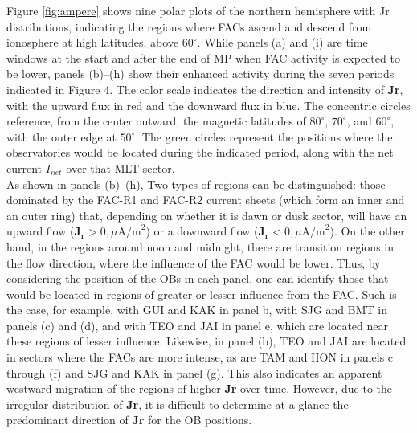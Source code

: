 \documentclass[a4paper]{article}
\theoremstyle{plain}
\theoremstyle{definition}
\begin{document}
Figure \ref{fig:ampere} shows nine polar plots of the northern hemisphere with Jr distributions, indicating the regions where FACs ascend and descend from ionosphere at high latitudes, above $60^\circ$. While panels (a) and (i) are time windows at the start and after the end of MP when FAC activity is expected to be lower, panels (b)–(h) show their enhanced activity during the seven periods indicated in Figure 4. The color scale indicates the direction and intensity of \textbf{Jr}, with the upward flux in red and the downward flux in blue. The concentric circles reference, from the center outward, the magnetic latitudes of $80^\circ$, $70^\circ$, and $60^\circ$, with the outer edge at $50^\circ$. The green circles represent the positions where the observatories would be located during the indicated period, along with the net current $I_{net}$ over that MLT sector.\\	

	
	
	As shown in panels (b)–(h), Two types of regions can be distinguished: those dominated by the FAC-R1 and FAC-R2 current sheets (which form an inner and an outer ring) that, depending on whether it is dawn or dusk sector, will have an upward flow ($\mathbf{J_r} > 0 , \mu\text{A/m}^2$) or a downward flow ($\mathbf{J_r} < 0 , \mu\text{A/m}^2$). On the other hand, in the regions around noon and midnight, there are transition regions in the flow direction, where the influence of the FAC would be lower. Thus, by considering the position of the OBs in each panel, one can identify those that would be located in regions of greater or lesser influence from the FAC. Such is the case, for example, with GUI and KAK in panel b, with SJG and BMT in panels (c) and (d), and with TEO and JAI in panel e, which are located near these regions of lesser influence. Likewise, in panel (b), TEO and JAI are located in sectors where the FACs are more intense, as are TAM and HON in panels c through (f) and SJG and KAK in panel (g). This also indicates an apparent westward migration of the regions of higher \textbf{Jr} over time. However, due to the irregular distribution of \textbf{Jr}, it is difficult to determine at a glance the predominant direction of \textbf{Jr} for the OB positions.\\
	
\end{document}
